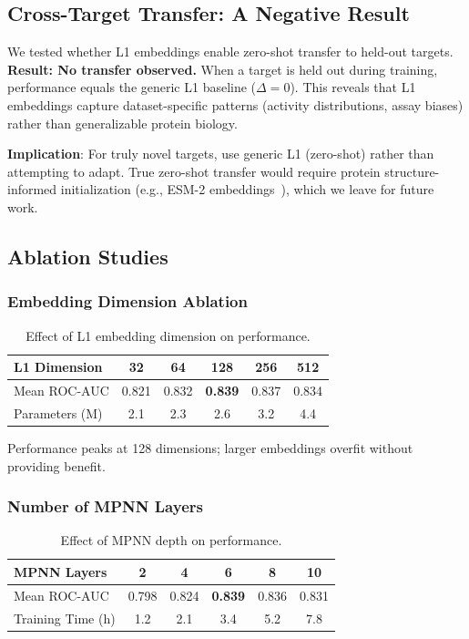 \documentclass[sigconf]{acmart}
\begin{document}
\subsection{Cross-Target Transfer: A Negative Result}

We tested whether L1 embeddings enable zero-shot transfer to held-out targets. \textbf{Result: No transfer observed.} When a target is held out during training, performance equals the generic L1 baseline ($\Delta = 0$). This reveals that L1 embeddings capture dataset-specific patterns (activity distributions, assay biases) rather than generalizable protein biology.

\textbf{Implication}: For truly novel targets, use generic L1 (zero-shot) rather than attempting to adapt. True zero-shot transfer would require protein structure-informed initialization (e.g., ESM-2 embeddings~\cite{lin_2023_esm2}), which we leave for future work.

\subsection{Ablation Studies}

\subsubsection{Embedding Dimension Ablation}

\begin{table}[h]
\caption{Effect of L1 embedding dimension on performance.}
\label{tab:dim_ablation}
\centering
\small
\begin{tabular}{@{}lccccc@{}}
\toprule
L1 Dimension & 32 & 64 & 128 & 256 & 512 \\
\midrule
Mean ROC-AUC & 0.821 & 0.832 & \textbf{0.839} & 0.837 & 0.834 \\
Parameters (M) & 2.1 & 2.3 & 2.6 & 3.2 & 4.4 \\
\bottomrule
\end{tabular}
\end{table}

Performance peaks at 128 dimensions; larger embeddings overfit without providing benefit.

\subsubsection{Number of MPNN Layers}

\begin{table}[h]
\caption{Effect of MPNN depth on performance.}
\label{tab:depth_ablation}
\centering
\small
\begin{tabular}{@{}lccccc@{}}
\toprule
MPNN Layers & 2 & 4 & 6 & 8 & 10 \\
\midrule
Mean ROC-AUC & 0.798 & 0.824 & \textbf{0.839} & 0.836 & 0.831 \\
Training Time (h) & 1.2 & 2.1 & 3.4 & 5.2 & 7.8 \\
\bottomrule
\end{tabular}
\end{table}
\end{document}
